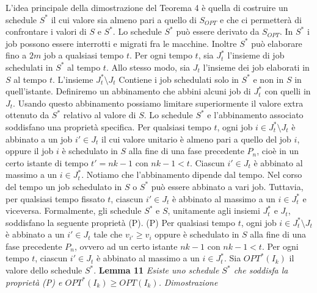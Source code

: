 \documentclass[twoside,openany,titlepage,fleqn,
	headinclude,12pt,a4paper,BCOR5mm,footinclude]{scrbook}
\begin{document}
L'idea principale della dimostrazione del Teorema 4 è quella di costruire un schedule $S^{*}$ il cui valore sia almeno pari a quello di $S_{OPT}$ e che ci permetterà di confrontare i valori di $S$ e $S^{*}$. Lo schedule $S^{*}$ può essere derivato da $S_{OPT}$. In $S^{*}$ i job possono essere interrotti e migrati fra le macchine. Inoltre $S^{*}$ può elaborare fino a $2m$ job a qualsiasi tempo $t$.
Per ogni tempo $t$, sia $J_{t}^{*}$ l'insieme di job schedulati in $S^{*}$ al tempo $t$. Allo stesso modo, sia $J_{t}$ l'insieme dei job elaborati in $S$ al tempo $t$. L'insieme $J_{t}^{*} \setminus J_{t}$ Contiene i job schedulati solo in $S^{*}$ e non in $S$ in quell'istante. Definiremo un abbinamento che abbini alcuni job di $J_{t}^{*}$ con quelli in $J_{t}$. Usando questo abbinamento possiamo limitare superiormente il valore extra ottenuto da $S^{*}$ relativo al valore di $S$. Lo schedule $S^{*}$ e l'abbinamento associato soddisfano una proprietà specifica. Per qualsiasi tempo $t$, ogni job $i \in J_{t}^{*} \setminus J_{t}$ è abbinato a un job $i' \in J_{t}$ il cui valore unitario è almeno pari a quello del job $i$, oppure il job $i$ è schedulato in $S$ alla fine di una fase precedente $P_{n}$, cioè in un certo istante di tempo $t' = nk -1$ con $nk -1 < t$. Ciascun $i' \in J_{t}$ è abbinato al massimo a un $i \in J_{t}^{*}$. Notiamo che l'abbinamento dipende dal tempo. Nel corso del tempo un job schedulato in $S$ o $S^{*}$ può essere abbinato a vari job. Tuttavia, per qualsiasi tempo fissato $t$, ciascun $i' \in J_{t}$ è abbinato al massimo a un $i \in J_{t}^{*}$ e viceversa. Formalmente, gli schedule $S^{*}$ e $S$, unitamente agli insiemi $J_{t}^{*}$ e $J_{t}$, soddisfano la seguente proprietà (P).
\newline
(P) Per qualsiasi tempo $t$, ogni job $i \in J_{t}^{*} \setminus J_{t}$ è abbinato a un $i' \in J_{t}$ tale che $v_{i'} \geq v_{i}$ oppure è schedulato in $S$ alla fine di una fase precedente $P_{n}$, ovvero ad un certo istante $nk - 1$ con $nk - 1 < t$. Per ogni tempo $t$, ciascun $i' \in J_{t}$ è abbinato al massimo a un $i \in J_{t}^{*}$.
Sia $OPT^{*}(I_{k})$ il valore dello schedule $S^{*}$.
\newline \newline
\textbf{Lemma 11}
\textit{Esiste uno schedule $S^{*}$ che soddisfa la proprietà (P) e $OPT^{*}(I_{k}) \geq OPT (I_{k})$.}
\newline \newline
\textit{Dimostrazione}
\end{document}
